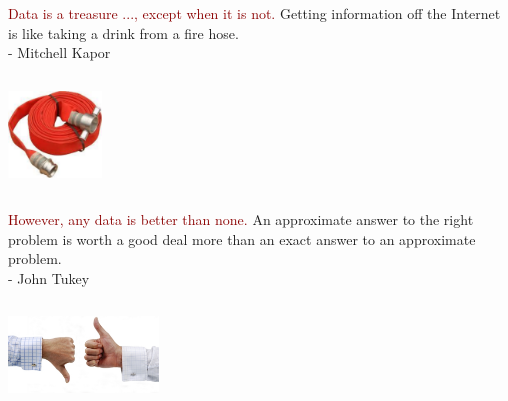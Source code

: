\documentclass{beamer}
\begin{document}
\begin{frame}
\begin{columns}
\column{25em}
\vspace{2cm}
\begin{block}{\centering\textcolor{darkred}{Data is a treasure ..., except when it is not.}}
\justifying
Getting information off the Internet is like taking a drink from a fire hose.\\
\vspace{.2cm}
\hspace*{7.2cm}\footnotesize{- Mitchell Kapor}
\end{block}
\end{columns}
\vspace{.75cm}
\hspace*{9cm}\includegraphics[width=2.5cm]{figs/firehose.pdf}
\end{frame}

\begin{frame}
\begin{columns}
\column{28em}
\vspace{2cm}
\begin{block}{\centering\textcolor{darkred}{However, any data is better than none.}}
\justifying
An approximate answer to the right problem is worth a good deal more than an exact answer to an approximate problem.\\
\vspace{.2cm}
\hspace*{8.7cm}\footnotesize{- John Tukey}
\end{block}
\end{columns}
\vspace{.75cm}
\hspace*{8cm}\includegraphics[width=4cm]{figs/deal.pdf}
\end{frame}
\end{document}
